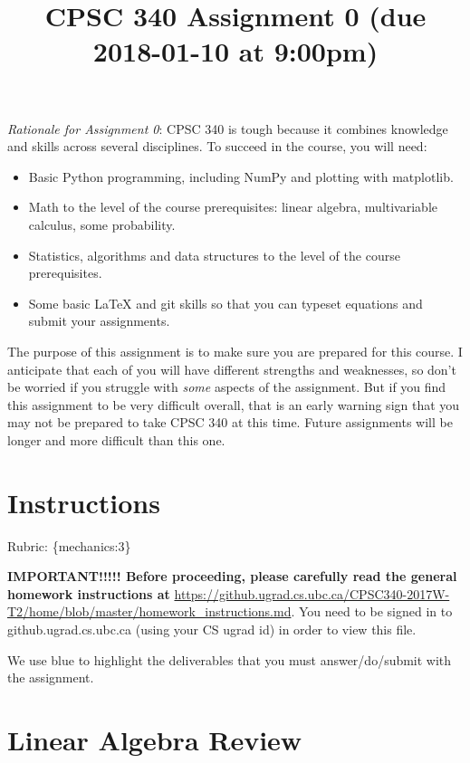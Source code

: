 \documentclass{article}
\def\rubric#1{\gre{Rubric: \{#1\}}}{}
\def\blu#1{{\color{blu}#1}}
\def\gre#1{{\color{gre}#1}}
\begin{document}
\title{CPSC 340 Assignment 0 (due 2018-01-10 at 9:00pm)}
\date{}
\maketitle

\vspace{-4em}

\emph{Rationale for Assignment 0}: CPSC 340 is tough because it combines knowledge and skills across several disciplines. To succeed
in the course, you will need:
\begin{itemize}
\item Basic Python programming, including NumPy and plotting with matplotlib.
\item Math to the level of the course prerequisites: linear algebra, multivariable calculus, some probability.
\item Statistics, algorithms and data structures to the level of the course prerequisites.
\item Some basic LaTeX and git skills so that you can typeset equations and submit your assignments.
\end{itemize}

The purpose of this assignment is to make sure you are prepared for this course. I anticipate that each
of you will have different strengths and weaknesses, so don't be worried if you struggle with \emph{some} aspects
of the assignment. But if you find this assignment
to be very difficult overall, that is an early warning sign that you may not be prepared to take CPSC 340
at this time. Future assignments will be longer and more difficult than this one.


\section*{Instructions}
\rubric{mechanics:3}

\textbf{IMPORTANT!!!!! Before proceeding, please carefully read the general homework instructions at} \url{https://github.ugrad.cs.ubc.ca/CPSC340-2017W-T2/home/blob/master/homework_instructions.md}.
You need to be signed in to github.ugrad.cs.ubc.ca (using your CS ugrad id) in order to view this file.


\vspace{1em}
We use \blu{blue} to highlight the deliverables that you must answer/do/submit with the assignment.



\section{Linear Algebra Review}
\end{document}
